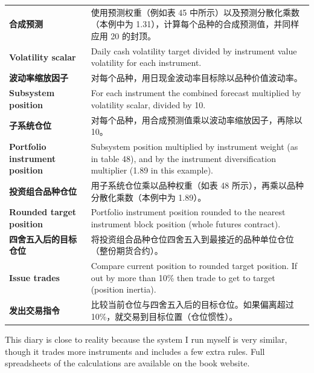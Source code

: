 \begin{bilingualtableblock}
{\begin{tabularx}{\textwidth}{@{} p{} Y@{}}
\textbf{合成预测} & 使用预测权重（例如表 45 中所示）以及预测分散化乘数（本例中为 1.31），计算每个品种的合成预测值，并同样应用 20 的封顶。 \\
\textbf{Volatility scalar} & Daily cash volatility target divided by instrument value volatility for each instrument. \\
\textbf{波动率缩放因子} & 对每个品种，用日现金波动率目标除以品种价值波动率。 \\
\textbf{Subsystem position} & For each instrument the combined forecast multiplied by volatility scalar, divided by 10. \\
\textbf{子系统仓位} & 对每个品种，用合成预测值乘以波动率缩放因子，再除以 10。 \\
\textbf{Portfolio instrument position} & Subsystem position multiplied by instrument weight (as in table 48), and by the instrument diversification multiplier (1.89 in this example). \\
\textbf{投资组合品种仓位} & 用子系统仓位乘以品种权重（如表 48 所示），再乘以品种分散化乘数（本例中为 1.89）。 \\
\textbf{Rounded target position} & Portfolio instrument position rounded to the nearest instrument block position (whole futures contract). \\
\textbf{四舍五入后的目标仓位} & 将投资组合品种仓位四舍五入到最接近的品种单位仓位（整份期货合约）。 \\
\textbf{Issue trades} & Compare current position to rounded target position. If out by more than 10\% then trade to get to target (position inertia). \\
\textbf{发出交易指令} & 比较当前仓位与四舍五入后的目标仓位。如果偏离超过 10\%，就交易到目标位置（仓位惯性）。 \\
\end{tabularx}
}
\end{bilingualtableblock}



\begin{englishblock} This diary is close to reality because the system I run myself is very similar, though it trades more instruments and includes a few extra rules. Full spreadsheets of the calculations are available on the book website. \end{englishblock}

